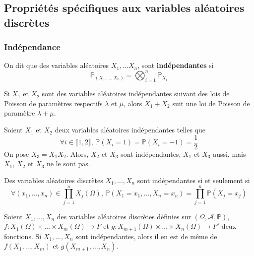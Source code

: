   \subsection{Propriétés spécifiques aux variables aléatoires discrètes}

  \subsubsection{Indépendance}


  \begin{definition}
    On dit que des variables aléatoires $X_1, \dots X_n$, sont \textbf{indépendantes} si
    \[ \mathbb{P}_{(X_1, \dots, X_n)} = \bigotimes_{i=1}^n \mathbb{P}_{X_i} \]
  \end{definition}


  \begin{example}
    Si $X_1$ et $X_2$ sont des variables aléatoires indépendantes suivant des lois de Poisson de paramètres respectifs $\lambda$ et $\mu$, alors $X_1 + X_2$ suit une loi de Poisson de paramètre $\lambda + \mu$.
  \end{example}

  \begin{cexample}
    Soient $X_1$ et $X_2$ deux variables aléatoires indépendantes telles que
    \[ \forall i \in \llbracket 1, 2 \rrbracket, \, \mathbb{P}(X_i = 1) = \mathbb{P}(X_i = -1) = \frac{1}{2} \]
    On pose $X_3 = X_1 X_2$. Alors, $X_2$ et $X_3$ sont indépendantes, $X_1$ et $X_3$ aussi, mais $X_1$, $X_2$ et $X_3$ ne le sont pas.
  \end{cexample}


  \begin{proposition}
    Des variables aléatoires discrètes $X_1, \dots, X_n$ sont indépendantes si et seulement si
    \[ \forall (x_1,\dots,x_n) \in \prod_{j=1}^n X_j(\Omega), \, \mathbb{P}(X_1 = x_1, \dots, X_n = x_n) = \prod_{j = 1}^n \mathbb{P}(X_j = x_j) \]
  \end{proposition}

  \begin{proposition}
    Soient $X_1, \dots, X_n$ des variables aléatoires discrètes définies sur $(\Omega, \mathcal{A}, \mathbb{P})$, $f : X_1(\Omega) \times \dots \times X_m(\Omega) \rightarrow F$ et $g : X_{m+1}(\Omega) \times \dots \times X_n(\Omega) \rightarrow F'$ deux fonctions. Si $X_1, \dots, X_n$ sont indépendantes, alors il en est de même de $f(X_1, \dots, X_m)$ et $g(X_{m+1}, \dots, X_n)$.
  \end{proposition}

